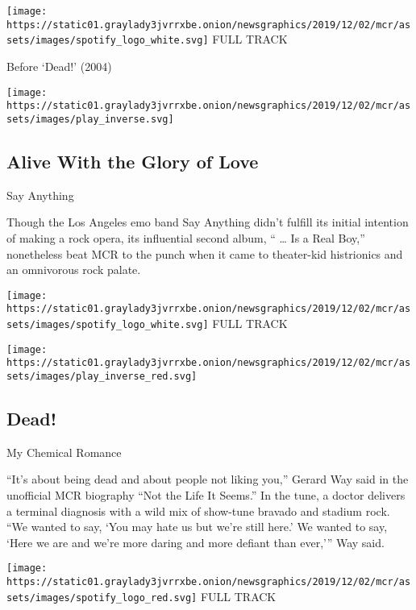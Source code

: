 \href{https://open.spotify.com/track/6TBJCwgdhwkzjpSjdqJUHC}{}

\texttt{[image: https://static01.graylady3jvrrxbe.onion/newsgraphics/2019/12/02/mcr/assets/images/spotify\_logo\_white.svg]}
FULL TRACK

Before `Dead!' (2004)

\texttt{[image: https://static01.graylady3jvrrxbe.onion/newsgraphics/2019/12/02/mcr/assets/images/play\_inverse.svg]}

\hypertarget{alive-with-the-glory-of-love}{%
\subsection{Alive With the Glory of
Love}\label{alive-with-the-glory-of-love}}

Say Anything

Though the Los Angeles emo band Say Anything didn't fulfill its initial
intention of making a rock opera, its influential second album, ``
\ldots{} Is a Real Boy,'' nonetheless beat MCR to the punch when it came
to theater-kid histrionics and an omnivorous rock palate.

\href{https://open.spotify.com/track/53kRlOPQfNWhSraUytOMUY?si=vLMH0zdBRH6otzSKIayw6Q}{}

\texttt{[image: https://static01.graylady3jvrrxbe.onion/newsgraphics/2019/12/02/mcr/assets/images/spotify\_logo\_white.svg]}
FULL TRACK

\texttt{[image: https://static01.graylady3jvrrxbe.onion/newsgraphics/2019/12/02/mcr/assets/images/play\_inverse\_red.svg]}

\hypertarget{dead-1}{%
\subsection{Dead!}\label{dead-1}}

My Chemical Romance

``It's about being dead and about people not liking you,'' Gerard Way
said in the unofficial MCR biography ``Not the Life It Seems.'' In the
tune, a doctor delivers a terminal diagnosis with a wild mix of
show-tune bravado and stadium rock. ``We wanted to say, `You may hate us
but we're still here.' We wanted to say, `Here we are and we're more
daring and more defiant than ever,''' Way said.

\href{https://open.spotify.com/track/0uukw2CgEIApv4IWAjXrBC?si=gD3I4aGiRDCueN6d7CA9OA}{}

\texttt{[image: https://static01.graylady3jvrrxbe.onion/newsgraphics/2019/12/02/mcr/assets/images/spotify\_logo\_red.svg]}
FULL TRACK

